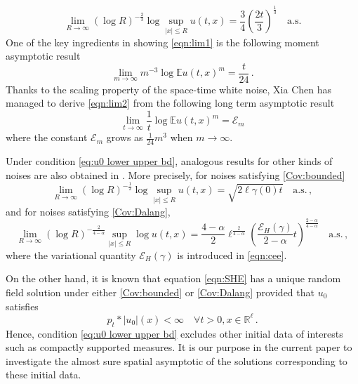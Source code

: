 \documentclass[12pt,reqno]{amsart}
\theoremstyle{remark}
\newcommand{\1}{\mathbf{1}}
\def\RR{\mathbb{R}}
\def\EE{\mathbb{E}}
\def\cee{{\mathcal E}}
\def\lt{\left}
\def\rt{\right}
\begin{document}
	\begin{equation}\label{eqn:lim1}
		\lim_{R\to\infty}(\log R)^{-\frac23}{\log\sup_{|x|\le R}u(t,x)}=\frac34 \lt(\frac{2t}3\rt)^{\frac13}\quad \mathrm{a.s.}
	\end{equation}
	One of the key ingredients in showing \eqref{eqn:lim1} is the following moment asymptotic result
	\begin{equation}\label{eqn:lim2}
		\lim_{m\to\infty}m^{-3}\log\EE u(t,x)^m=\frac t{24}\,.
	\end{equation}
	Thanks to the scaling property of the space-time white noise, Xia Chen has managed to derive \eqref{eqn:lim2} from the following long term asymptotic result
	\begin{equation}\label{eqn:lim3}
		\lim_{t\to\infty}\frac1t\log\EE u(t,x)^m= \cee_m
	\end{equation}
	where the constant $\cee_m$ grows as $\frac1{24}m^3$ when $m\to\infty$. 

	Under condition \eqref{eq:u0 lower upper bd}, analogous results for other kinds of noises are also obtained in \cite{MR3474477}. More precisely, for noises satisfying \ref{Cov:bounded}
	\begin{equation}
		\lim_{R\to\infty}(\log R)^{-\frac12}\log \sup_{|x|\le R}u(t,x)=\sqrt{2\ell \gamma(0)t}\quad \mathrm{a.s.}\,,
	\end{equation}
	and for noises satisfying \ref{Cov:Dalang}, 
	\begin{equation}
			\lim_{R\to\infty}(\log R)^{-\frac2{4- \alpha}}\sup_{|x|\le R}\log u(t,x)=\frac{4- \alpha}2\ell^{\frac2{4- \alpha}} \lt(\frac{\cee_H(\gamma)}{2- \alpha}t \rt)^{\frac{2- \alpha}{4- \alpha}} \quad \mathrm{a.s.}\,,
	\end{equation}
	where the variational quantity $\cee_H(\gamma)$ is introduced in \eqref{eqn:cee}. 

	On the other hand, it is known that equation \eqref{eqn:SHE} has a unique random field solution under either \ref{Cov:bounded} or \ref{Cov:Dalang} provided that $u_0$ satisfies
	\begin{equation}\label{con:u0}
		p_t*|u_0|(x) <\infty\quad\forall t>0,x\in\RR^\ell\,.
	\end{equation}
	Hence, condition \eqref{eq:u0 lower upper bd} excludes other initial data of interests such as compactly supported measures. It is our purpose in the current paper to investigate the almost sure spatial asymptotic of the solutions corresponding to these initial data. 
\end{document}
